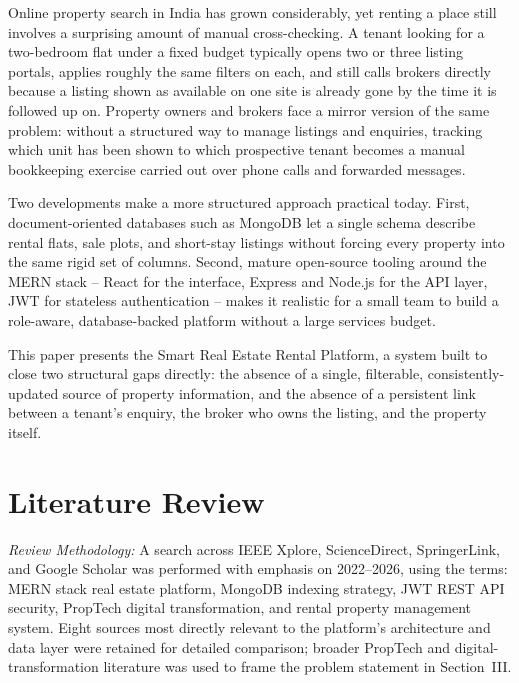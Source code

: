 \documentclass[10pt,twocolumn]{article}
\begin{document}
Online property search in India has grown considerably, yet renting a place still involves a surprising amount of manual cross-checking. A tenant looking for a two-bedroom flat under a fixed budget typically opens two or three listing portals, applies roughly the same filters on each, and still calls brokers directly because a listing shown as available on one site is already gone by the time it is followed up on. Property owners and brokers face a mirror version of the same problem: without a structured way to manage listings and enquiries, tracking which unit has been shown to which prospective tenant becomes a manual bookkeeping exercise carried out over phone calls and forwarded messages.

Two developments make a more structured approach practical today. First, document-oriented databases such as MongoDB let a single schema describe rental flats, sale plots, and short-stay listings without forcing every property into the same rigid set of columns. Second, mature open-source tooling around the MERN stack -- React for the interface, Express and Node.js for the API layer, JWT for stateless authentication -- makes it realistic for a small team to build a role-aware, database-backed platform without a large services budget.

This paper presents the Smart Real Estate Rental Platform, a system built to close two structural gaps directly: the absence of a single, filterable, consistently-updated source of property information, and the absence of a persistent link between a tenant's enquiry, the broker who owns the listing, and the property itself.

\section{Literature Review}

\textit{Review Methodology:} A search across IEEE Xplore, ScienceDirect, SpringerLink, and Google Scholar was performed with emphasis on 2022--2026, using the terms: MERN stack real estate platform, MongoDB indexing strategy, JWT REST API security, PropTech digital transformation, and rental property management system. Eight sources most directly relevant to the platform's architecture and data layer were retained for detailed comparison; broader PropTech and digital-transformation literature was used to frame the problem statement in Section~III.
\end{document}
